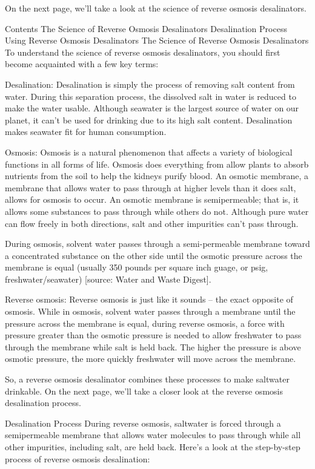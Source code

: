On the next page, we'll take a look at the science of reverse osmosis desalinators.

Contents
The Science of Reverse Osmosis Desalinators
Desalination Process
Using Reverse Osmosis Desalinators
The Science of Reverse Osmosis Desalinators
To understand the science of reverse osmosis desalinators, you should first become acquainted with a few key terms:

Desalination: Desalination is simply the process of removing salt content from water. During this separation process, the dissolved salt in water is reduced to make the water usable. Although seawater is the largest source of water on our planet, it can't be used for drinking due to its high salt content. Desalination makes seawater fit for human consumption.

Osmosis: Osmosis is a natural phenomenon that affects a variety of biological functions in all forms of life. Osmosis does everything from allow plants to absorb nutrients from the soil to help the kidneys purify blood. An osmotic membrane, a membrane that allows water to pass through at higher levels than it does salt, allows for osmosis to occur. An osmotic membrane is semipermeable; that is, it allows some substances to pass through while others do not. Although pure water can flow freely in both directions, salt and other impurities can't pass through.

During osmosis, solvent water passes through a semi-permeable membrane toward a concentrated substance on the other side until the osmotic pressure across the membrane is equal (usually 350 pounds per square inch guage, or psig, freshwater/seawater) [source: Water and Waste Digest].

Reverse osmosis: Reverse osmosis is just like it sounds -- the exact opposite of osmosis. While in osmosis, solvent water passes through a membrane until the pressure across the membrane is equal, during reverse osmosis, a force with pressure greater than the osmotic pressure is needed to allow freshwater to pass through the membrane while salt is held back. The higher the pressure is above osmotic pressure, the more quickly freshwater will move across the membrane.

So, a reverse osmosis desalinator combines these processes to make saltwater drinkable. On the next page, we'll take a closer look at the reverse osmosis desalination process.

Desalination Process
During reverse osmosis, saltwater is forced through a semipermeable membrane that allows water molecules to pass through while all other impurities, including salt, are held back. Here's a look at the step-by-step process of reverse osmosis desalination:

